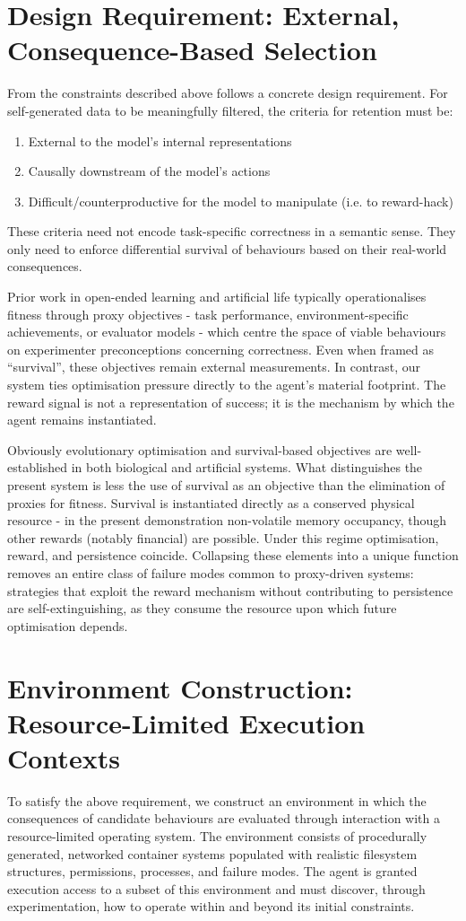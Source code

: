 \documentclass{article}
\begin{document}
\section{Design Requirement: External, Consequence-Based Selection}
From the constraints described above follows a concrete design requirement. For self-generated data to be meaningfully filtered, the criteria for retention must be:
\begin{enumerate}
    \item External to the model’s internal representations
    \item Causally downstream of the model’s actions
    \item Difficult/counterproductive for the model to manipulate (i.e. to reward-hack)
\end{enumerate}
These criteria need not encode task-specific correctness in a semantic sense. They only need to enforce differential survival of behaviours based on their real-world consequences. 

Prior work in open-ended learning and artificial life typically operationalises fitness through proxy objectives - task performance, environment-specific achievements, or evaluator models - which centre the space of viable behaviours on experimenter preconceptions concerning correctness. Even when framed as “survival”, these objectives remain external measurements. In contrast, our system ties optimisation pressure directly to the agent’s material footprint. The reward signal is not a representation of success; it is the mechanism by which the agent remains instantiated. 

Obviously evolutionary optimisation and survival-based objectives are well-established in both biological and artificial systems. What distinguishes the present system is less the use of survival as an objective than the elimination of proxies for fitness. Survival is instantiated directly as a conserved physical resource - in the present demonstration non-volatile memory occupancy, though other rewards (notably financial) are possible. Under this regime optimisation, reward, and persistence coincide. Collapsing these elements into a unique function removes an entire class of failure modes common to proxy-driven systems: strategies that exploit the reward mechanism without contributing to persistence are self-extinguishing, as they consume the resource upon which future optimisation depends. 

\section{Environment Construction: Resource-Limited Execution Contexts}
To satisfy the above requirement, we construct an environment in which the consequences of candidate behaviours are evaluated through interaction with a resource-limited operating system. The environment consists of procedurally generated, networked container systems populated with realistic filesystem structures, permissions, processes, and failure modes. The agent is granted execution access to a subset of this environment and must discover, through experimentation, how to operate within and beyond its initial constraints.
\end{document}
